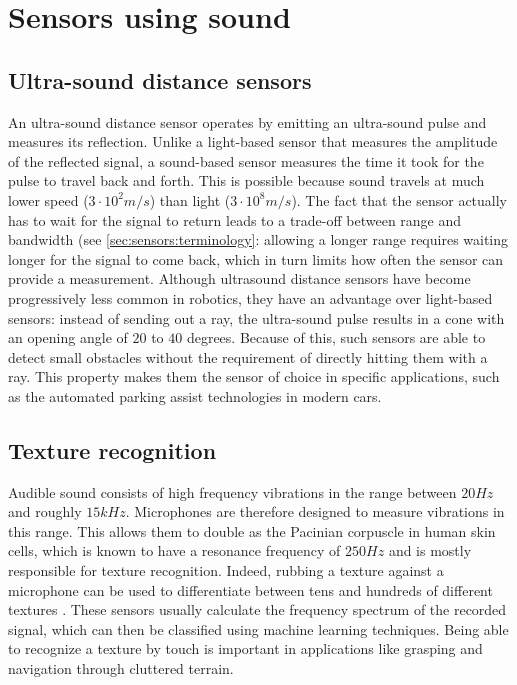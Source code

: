 \section{Sensors using sound}\label{sec:sensors:sound}

\subsection{Ultra-sound distance sensors}

An ultra-sound distance sensor operates by emitting an ultra-sound pulse and measures its reflection. Unlike a light-based sensor that measures the amplitude of the reflected signal, a sound-based sensor measures the time it took for the pulse to travel back and forth.
This is possible because sound travels at much lower speed ($3\cdot10^2m/s$) than light ($3\cdot10^8m/s$). The fact that the sensor actually has to wait for the signal to return leads to a trade-off between range and bandwidth (see \cref{sec:sensors:terminology}: allowing a longer range requires waiting longer for the signal to come back, which in turn limits how often the sensor can provide a measurement.
Although ultrasound distance sensors have become progressively less common in robotics, they have an advantage over light-based sensors: instead of sending out a ray, the ultra-sound pulse results in a cone with an opening angle of $20$ to $40$ degrees. Because of this, such sensors are able to detect small obstacles without the requirement of directly hitting them with a ray. This property makes them the sensor of choice in specific applications, such as the automated parking assist technologies in modern cars.

\subsection{Texture recognition}

Audible sound consists of high frequency vibrations in the range between $20Hz$ and roughly $15kHz$. Microphones are therefore designed to measure vibrations in this range. This allows them to double as the Pacinian corpuscle in human skin cells, which is known to have a resonance frequency of $250Hz$ and is mostly responsible for texture recognition. Indeed, rubbing a texture against a microphone can be used to differentiate between tens and hundreds of different textures \cite{hughes14}. These sensors usually calculate the frequency spectrum of the recorded signal, which can then be classified using machine learning techniques. Being able to recognize a texture by touch is important in applications like grasping and navigation through cluttered terrain.

